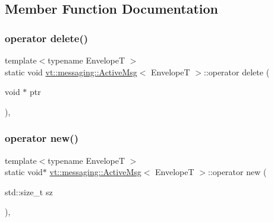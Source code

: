 \subsection{Member Function Documentation}
\mbox{\label{structvt_1_1messaging_1_1_active_msg_a37cd0731f99157266333772f501d390d}} 
\subsubsection{\texorpdfstring{operator delete()}{operator delete()}}
{\footnotesize\ttfamily template$<$typename EnvelopeT $>$ \\
static void \hyperlink{structvt_1_1messaging_1_1_active_msg}{vt\+::messaging\+::\+Active\+Msg}$<$ EnvelopeT $>$\+::operator delete (\begin{DoxyParamCaption}\item[{void $\ast$}]{ptr }\end{DoxyParamCaption})\hspace{0.3cm}{\ttfamily [inline]}, {\ttfamily [static]}}

\mbox{\label{structvt_1_1messaging_1_1_active_msg_ac79d16742251f19ed94f9725ed866f64}} 
\subsubsection{\texorpdfstring{operator new()}{operator new()}\hspace{0.1cm}{\footnotesize\ttfamily [1/3]}}
{\footnotesize\ttfamily template$<$typename EnvelopeT $>$ \\
static void$\ast$ \hyperlink{structvt_1_1messaging_1_1_active_msg}{vt\+::messaging\+::\+Active\+Msg}$<$ EnvelopeT $>$\+::operator new (\begin{DoxyParamCaption}\item[{std\+::size\+\_\+t}]{sz }\end{DoxyParamCaption})\hspace{0.3cm}{\ttfamily [inline]}, {\ttfamily [static]}}

